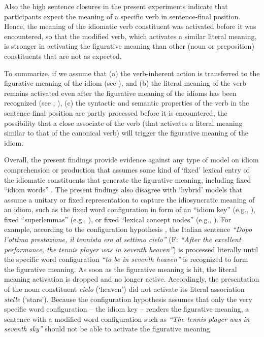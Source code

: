 \documentclass[output=paper]{langsci/langscibook}
\begin{document}
Also the high sentence closures in the present experiments indicate that participants expect the meaning of a specific verb in sentence-final position. Hence, the meaning of the idiomatic verb constituent was activated before it was encountered, so that the modified verb, which activates a similar literal meaning, is stronger in activating the figurative meaning than other (noun or preposition) constituents that are not as expected. 


To summarize, if we assume that (a) the verb-inherent action is transferred to the figurative meaning of the idiom (see \citealt{hamblin:1999}), and (b) the literal meaning of the verb remains activated even after the figurative meaning of the idioms has been recognized (see \citealt{rabanus:2008}; \citealt{smolka:2007}), (c) the syntactic and semantic properties of the verb in the sentence-final position are partly processed before it is encountered, the possibility that a close associate of the verb (that activates a literal meaning similar to that of the canonical verb) will trigger the figurative meaning of the idiom.  


Overall, the present findings provide evidence against any type of model on idiom comprehension or production that assumes some kind of ‘fixed’ lexical entry of the idiomatic constituents that generate the figurative meaning, including fixed ``idiom words'' \citep{bobrow:1973}. The present findings also disagree with ‘hybrid’ models that assume a unitary or fixed representation to capture the idiosyncratic meaning of an idiom, such as the fixed word configuration in form of an ``idiom key'' (e.g., \citealt{cacciari:1988}), fixed ``superlemmas'' (e.g., \citealt{sprenger:2006}), or fixed ``lexical concept nodes'' (e.g., \citealt{cutting:1997}). For example, according to the configuration hypothesis \citep{cacciari:1988}, the Italian sentence \textit{``Dopo l’ottima prestazione, il tennista era al settimo cielo''} (F: \textit{``After the excellent performance, the tennis player was in seventh heaven''}) is processed literally until the specific word configuration \textit{``to be in seventh heaven''} is recognized to form the figurative meaning. As soon as the figurative meaning is hit, the literal meaning activation is dropped and no longer active. Accordingly, the presentation of the noun constituent \textit{cielo} (‘heaven’) did not activate its literal association \textit{stelle} (‘stars’). Because the configuration hypothesis assumes that only the very specific word configuration -- the idiom key -- renders the figurative meaning, a sentence with a modified word configuration such as \textit{``The tennis player was in seventh sky''} should not be able to activate the figurative meaning. 
\end{document}
